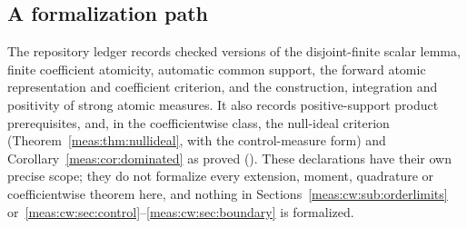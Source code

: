 \documentclass[11pt]{article}
\numberwithin{equation}{section}
\theoremstyle{definition}
\theoremstyle{remark}
\begin{document}
\subsection{A formalization path}

The repository ledger  records checked
versions of the disjoint-finite scalar lemma, finite coefficient atomicity,
automatic common support, the forward atomic representation and coefficient
criterion, and the construction, integration and positivity of strong atomic
measures. It also records positive-support product prerequisites, and, in the
coefficientwise class, the null-ideal criterion (Theorem~\ref{meas:thm:nullideal},
with the control-measure form) and Corollary~\ref{meas:cor:dominated} as proved
(). These
declarations have their own precise scope; they do not formalize every
extension, moment, quadrature or coefficientwise theorem here, and nothing in
Sections~\ref{meas:cw:sub:orderlimits} or~\ref{meas:cw:sec:control}--\ref{meas:cw:sec:boundary}
is formalized.
\end{document}

